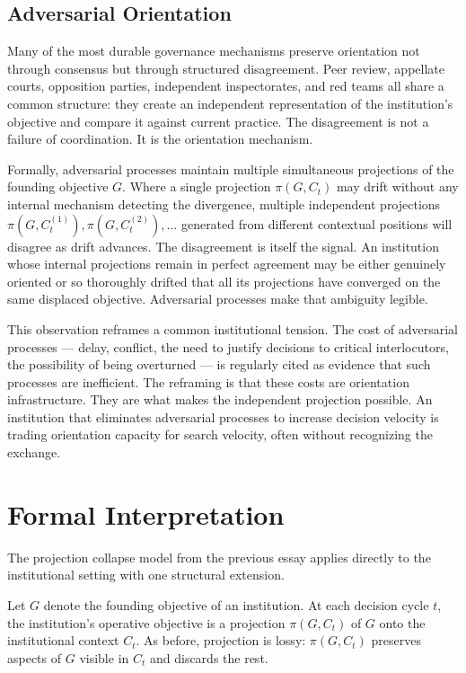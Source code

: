 \subsection*{Adversarial Orientation}

Many of the most durable governance mechanisms preserve orientation not through
consensus but through structured disagreement. Peer review, appellate courts,
opposition parties, independent inspectorates, and red teams all share a common
structure: they create an independent representation of the institution's
objective and compare it against current practice. The disagreement is not
a failure of coordination. It is the orientation mechanism.

Formally, adversarial processes maintain multiple simultaneous projections of
the founding objective $G$. Where a single projection $\pi(G, C_t)$ may drift
without any internal mechanism detecting the divergence, multiple independent
projections $\pi(G, C_t^{(1)}), \pi(G, C_t^{(2)}), \ldots$ generated from
different contextual positions will disagree as drift advances. The disagreement
is itself the signal. An institution whose internal projections remain in
perfect agreement may be either genuinely oriented or so thoroughly drifted
that all its projections have converged on the same displaced objective.
Adversarial processes make that ambiguity legible.

This observation reframes a common institutional tension. The cost of adversarial
processes --- delay, conflict, the need to justify decisions to critical
interlocutors, the possibility of being overturned --- is regularly cited as
evidence that such processes are inefficient. The reframing is that these costs
are orientation infrastructure. They are what makes the independent projection
possible. An institution that eliminates adversarial processes to increase
decision velocity is trading orientation capacity for search velocity, often
without recognizing the exchange.

\section{Formal Interpretation}

The projection collapse model from the previous essay applies directly to
the institutional setting with one structural extension.

Let $G$ denote the founding objective of an institution. At each decision
cycle $t$, the institution's operative objective is a projection
$\pi(G, C_t)$ of $G$ onto the institutional context $C_t$. As before,
projection is lossy: $\pi(G, C_t)$ preserves aspects of $G$ visible in
$C_t$ and discards the rest.

